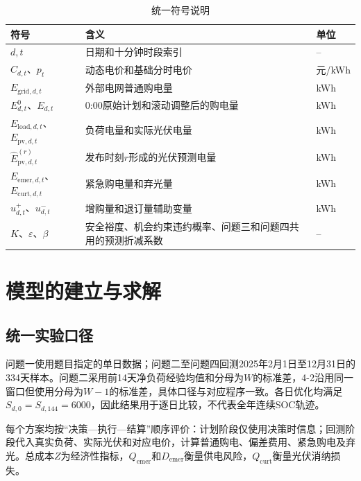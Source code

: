 \documentclass{cumcmthesis}
\begin{document}
\begin{table}[H]
\centering
\renewcommand\arraystretch{1.2}
\caption{统一符号说明}
\label{tab:symbols}
\begin{tabular}{p{3.5cm}p{7.3cm}p{2.0cm}}
\toprule
\textbf{符号} & \textbf{含义} & \textbf{单位}\\
\midrule
$d,t$ & 日期和十分钟时段索引 & --\\
$C_{d,t}$、$p_t$ & 动态电价和基础分时电价 & 元/kWh\\
$E_{\mathrm{grid},d,t}$ & 外部电网普通购电量 & kWh\\
$E^0_{d,t}$、$E_{d,t}$ & 0:00原始计划和滚动调整后的购电量 & kWh\\
$E_{\mathrm{load},d,t}$、$E_{\mathrm{pv},d,t}$ & 负荷电量和实际光伏电量 & kWh\\
$\widehat E^{(r)}_{\mathrm{pv},d,t}$ & 发布时刻$r$形成的光伏预测电量 & kWh\\
$E_{\mathrm{emer},d,t}$、$E_{\mathrm{curt},d,t}$ & 紧急购电量和弃光量 & kWh\\
$u^+_{d,t}$、$u^-_{d,t}$ & 增购量和退订量辅助变量 & kWh\\
$K$、$\varepsilon$、$\beta$ & 安全裕度、机会约束违约概率、问题三和问题四共用的预测折减系数 & --\\
\bottomrule
\end{tabular}
\end{table}

\section{模型的建立与求解}

\subsection{统一实验口径}

问题一使用题目指定的单日数据；问题二至问题四回测2025年2月1日至12月31日的334天样本。问题二采用前14天净负荷经验均值和分母为$W$的标准差，4-2沿用同一窗口但使用分母为$W-1$的标准差，具体口径与对应程序一致。各日优化均满足$S_{d,0}=S_{d,144}=6000$，因此结果用于逐日比较，不代表全年连续SOC轨迹。

每个方案均按“决策—执行—结算”顺序评价：计划阶段仅使用决策时信息；回测阶段代入真实负荷、实际光伏和对应电价，计算普通购电、偏差费用、紧急购电及弃光。总成本$Z$为经济性指标，$Q_{\mathrm{emer}}$和$D_{\mathrm{emer}}$衡量供电风险，$Q_{\mathrm{curt}}$衡量光伏消纳损失。
\end{document}
